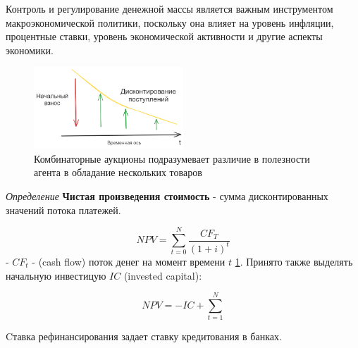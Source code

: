 Контроль и регулирование денежной массы является важным инструментом макроэкономической политики, поскольку она влияет на уровень инфляции, процентные ставки, уровень экономической активности и другие аспекты экономики.

\begin{figure}[h]
    \centering
    \includegraphics[width=0.5\textwidth]{assets/overview/cash_flow.excalidraw.png}
    \caption{Комбинаторные аукционы подразумевает различие в полезности агента в обладание нескольких товаров}
    \label{npv}
\end{figure}


\textit{Определение} \textbf{Чистая произведения стоимость} - сумма дисконтированных значений потока платежей.

$$
    NPV = \sum_{t=0}^N \frac{CF_T}{(1+i)^t}
$$
- $CF_t$  - (cash flow) поток денег на момент времени $t$ \ref{npv}.  
Принято также выделять начальную инвестицую $IC$ (invested capital):

$$
    NPV = -IC + \sum_{t=1}^N 
$$

Cтавка рефинансирования задает ставку кредитования в банках. 
